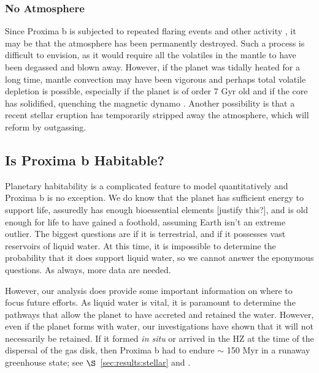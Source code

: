 \documentclass[preprint,12pt]{aastex}
\newcommand{\xxx}[1]{{\color{red} #1}} %
\newcommand{\xxx}[1]{{\color{red} #1}} %
\begin{document}
\subsubsection{No Atmosphere}
\label{sec:results:atmstates:noatmos}

Since Proxima b is subjected to repeated flaring events and other
activity \citep{Walker81,Davenport16}, it may be that the
atmosphere has been \xxx{permanently} destroyed. Such a process is
difficult to envision, as it would require all the volatiles in the
mantle to have been degassed and blown away. However, if the planet
was tidally heated for a long time, mantle convection may have been
vigorous and perhaps total volatile depletion is possible, especially
if the planet is of order 7 Gyr old and if the core has \xxx{solidified},
quenching the magnetic dynamo \xxx{\citep{DiscollBarnes15}}. Another possibility is that a recent
stellar eruption has temporarily stripped away the atmosphere, which
will reform by outgassing.

\subsection{Is Proxima b Habitable?}
\label{sec:results:habitable}

Planetary habitability is a complicated feature to model
quantitatively and Proxima b is no exception. We do know that the
planet has sufficient energy to support life, assuredly has enough
bioessential elements \xxx{[justify this?]}, and is old enough for life to have gained a
foothold, assuming Earth isn't an extreme outlier. The biggest
questions are if it is terrestrial, and if it possesses vast \xxx{reservoirs}
of liquid water. At this time, it is impossible to determine the
probability that it does support liquid water, so we cannot answer the
eponymous questions. As always, more data are needed.

However, our analysis does provide some important information on where
to focus future efforts. As liquid water is vital, it is paramount to
determine the pathways that allow the planet to have accreted and
retained the water. However, even if the planet forms with water, our
investigations have shown that it will not necessarily be retained. If
it formed {\it in situ} or arrived in the HZ at the time of the
dispersal of the gas disk, then Proxima b had to endure $\sim$ 150
Myr in a runaway greenhouse state; see $\S$~\ref{sec:results:stellar} and
\cite{LugerBarnes15}.
\end{document}

